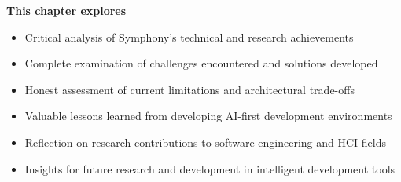\begin{tcolorbox}[
    enhanced,
    colback=white,
    colframe=brandPrimary!40,
    boxrule=1pt,
    arc=12pt,
    drop shadow={brandPrimary!20},
    left=1.5cm,
    right=1.5cm,
    top=1.2cm,
    bottom=1.2cm,
    before upper={\parindent0pt}
]
\begin{center}
{\Large\textbf{\textcolor{brandPrimary}{This chapter explores}}}
\end{center}

\vspace{0.8cm}

\begin{itemize}[leftmargin=1.2cm, itemsep=0.4cm, label={\textcolor{brandAccent}{$\triangleright$}}]
    \item {\large Critical analysis of Symphony's technical and research achievements}
    \item {\large Complete examination of challenges encountered and solutions developed}
    \item {\large Honest assessment of current limitations and architectural trade-offs}
    \item {\large Valuable lessons learned from developing AI-first development environments}
    \item {\large Reflection on research contributions to software engineering and HCI fields}
    \item {\large Insights for future research and development in intelligent development tools}
\end{itemize}
\end{tcolorbox}

\clearpage
